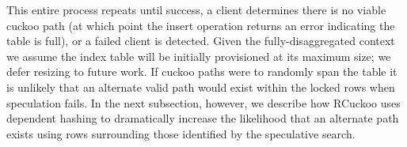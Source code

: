 This entire process repeats until success, a client determines there
is no viable cuckoo path (at which point the insert operation returns
an error indicating the table is full), or a failed client is detected.  Given the fully-disaggregated
context we assume the index table will be initially provisioned at its
maximum size; we defer resizing to future work.
If cuckoo paths were to randomly span the table it is unlikely that an
alternate valid path would exist within the locked rows when
speculation fails.  In the next subsection, however, we describe how
RCuckoo uses dependent hashing to dramatically increase the likelihood
that an alternate path exists using rows surrounding those identified
by the speculative search.





